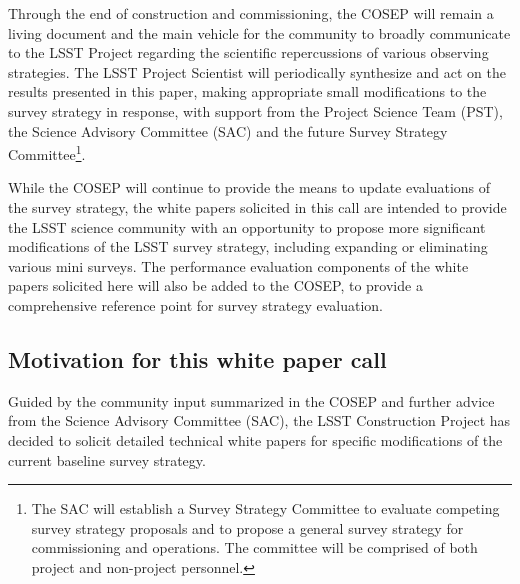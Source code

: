 \documentclass[DM,lsstdraft,toc,usenatbib]{lsstdoc}
\begin{document}
Through the end of construction and commissioning, the COSEP will remain a living document 
and the main vehicle for the community to broadly communicate to the LSST Project regarding 
the scientific repercussions of various observing strategies. The LSST Project Scientist will 
periodically synthesize and act on the results presented in this paper, making appropriate small modifications
to the survey strategy in response, with support from the 
Project Science Team (PST), the Science Advisory Committee (SAC) and the future Survey Strategy 
Committee\footnote{The SAC will establish a Survey 
Strategy Committee to evaluate competing survey strategy proposals and to propose a general survey 
strategy for commissioning and operations. The committee will be comprised of both project and 
non-project personnel.}. 

While the COSEP will continue to provide the means to update evaluations of the survey strategy, the white 
papers solicited in this call are intended to provide the LSST science community with an opportunity 
to propose more significant modifications of the LSST survey strategy, including expanding or eliminating various mini surveys.
The performance evaluation components of the white papers solicited here will also be added to the COSEP, to
provide a comprehensive reference point for survey strategy evaluation. 

\subsection{Motivation for this white paper call}

Guided by the community input summarized in the COSEP and further 
advice from the Science Advisory Committee (SAC), the LSST Construction Project has decided to
solicit detailed technical white papers for specific modifications of the current baseline survey strategy.
\end{document}
